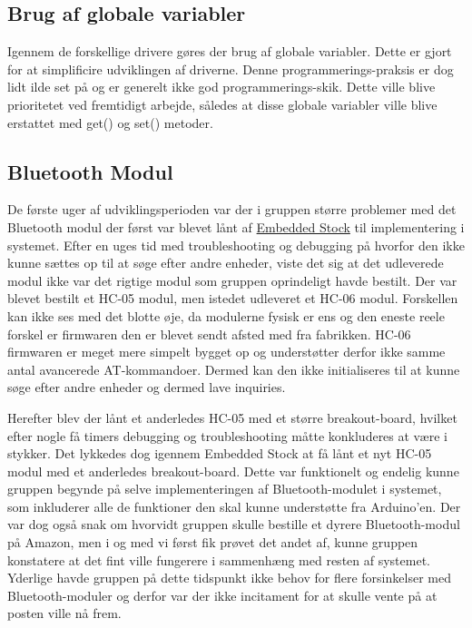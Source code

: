 \subsection{Brug af globale variabler}
Igennem de forskellige drivere gøres der brug af globale variabler. Dette er gjort for at simplificire udviklingen af driverne. Denne programmerings-praksis er dog lidt ilde set på og er generelt ikke god programmerings-skik. Dette ville blive prioritetet ved fremtidigt arbejde, således at disse globale variabler ville blive erstattet med get() og set() metoder. 

\subsection{Bluetooth Modul}
De første uger af udviklingsperioden var der i gruppen større problemer med det Bluetooth modul der først var blevet lånt af \href{https://stockmanager.ase.au.dk/}{Embedded Stock} til implementering i systemet. Efter en uges tid med troubleshooting og debugging på hvorfor den ikke kunne sættes op til at søge efter andre enheder, viste det sig at det udleverede modul ikke var det rigtige modul som gruppen oprindeligt havde bestilt. Der var blevet bestilt et HC-05 modul, men istedet udleveret et HC-06 modul. Forskellen kan ikke ses med det blotte øje, da modulerne fysisk er ens og den eneste reele forskel er firmwaren den er blevet sendt afsted med fra fabrikken. HC-06 firmwaren er meget mere simpelt bygget op og understøtter derfor ikke samme antal avancerede AT-kommandoer. Dermed kan den ikke initialiseres til at kunne søge efter andre enheder og dermed lave inquiries.

Herefter blev der lånt et anderledes HC-05 med et større breakout-board, hvilket efter nogle få timers debugging og troubleshooting måtte konkluderes at være i stykker. Det lykkedes dog igennem Embedded Stock at få lånt et nyt HC-05 modul med et anderledes breakout-board. Dette var funktionelt og endelig kunne gruppen begynde på selve implementeringen af Bluetooth-modulet i systemet, som inkluderer alle de funktioner den skal kunne understøtte fra Arduino'en. Der var dog også snak om hvorvidt gruppen skulle bestille et dyrere Bluetooth-modul på Amazon, men i og med vi først fik prøvet det andet af, kunne gruppen konstatere at det fint ville fungerere i sammenhæng med resten af systemet. Yderlige havde gruppen på dette tidspunkt ikke behov for flere forsinkelser med Bluetooth-moduler og derfor var der ikke incitament for at skulle vente på at posten ville nå frem.

